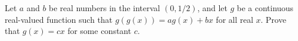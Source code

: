 Let $a$ and $b$ be real numbers in the interval $(0,1/2)$, and
let $g$ be a continuous real-valued function such that
$g(g(x))= ag(x)+bx$ for all real $x$.  Prove that
$g(x)=cx$ for some constant $c$.
